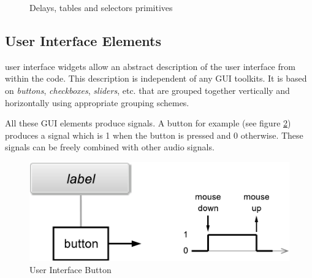 \documentclass[a4paper,10pt]{book}
\begin{document}
\begin{figure}
\caption{Delays, tables and selectors primitives }
\label{fig:delays}
\end{figure}


\subsection{User Interface Elements}


\faust user interface widgets allow an abstract description of the user interface from within the \faust code. This description is
independent of any GUI toolkits. It is based on \emph{buttons}, \emph{checkboxes}, \emph{sliders}, etc. that are grouped together vertically and
horizontally using appropriate grouping schemes.

All these GUI elements produce signals. A button for example (see figure \ref{fig:button}) produces a signal which is 1 when the button is pressed and 0 otherwise.
These signals can be freely combined with other audio signals.

\begin{figure}[h]
\centering
\includegraphics[scale=0.5]{illustrations/button}
\caption{User Interface Button}
\label{fig:button}
\end{figure}


\bigskip
\end{document}
